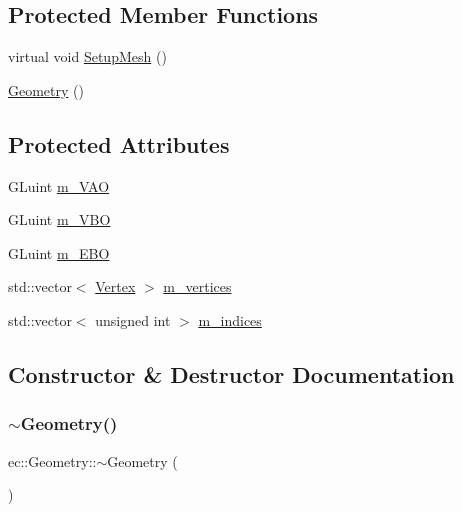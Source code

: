 \subsection*{Protected Member Functions}
\begin{DoxyCompactItemize}
\item 
virtual void \mbox{\hyperlink{classec_1_1_geometry_aec31f79de7f0afb78d4e3eb77b43574e}{Setup\+Mesh}} ()
\item 
\mbox{\hyperlink{classec_1_1_geometry_a409c80ac243a5eb27c2a98b17cc8b3e9}{Geometry}} ()
\end{DoxyCompactItemize}
\subsection*{Protected Attributes}
\begin{DoxyCompactItemize}
\item 
G\+Luint \mbox{\hyperlink{classec_1_1_geometry_af2451c093d0483611160531ac2a4f01e}{m\+\_\+\+V\+AO}}
\item 
G\+Luint \mbox{\hyperlink{classec_1_1_geometry_a418696e77f43a62bd8f78b8005ce7adf}{m\+\_\+\+V\+BO}}
\item 
G\+Luint \mbox{\hyperlink{classec_1_1_geometry_a5d57590449314c09c6950324f5da4f74}{m\+\_\+\+E\+BO}}
\item 
std\+::vector$<$ \mbox{\hyperlink{structec_1_1_vertex}{Vertex}} $>$ \mbox{\hyperlink{classec_1_1_geometry_a501c19ed82548d9a8ff628f55e750af3}{m\+\_\+vertices}}
\item 
std\+::vector$<$ unsigned int $>$ \mbox{\hyperlink{classec_1_1_geometry_ae6cf4719dfeee134a33a1272865f50a5}{m\+\_\+indices}}
\end{DoxyCompactItemize}


\subsection{Constructor \& Destructor Documentation}
\mbox{\label{classec_1_1_geometry_a964c581313da2be51a3c78d3be7f48b3}} 
\subsubsection{\texorpdfstring{$\sim$\+Geometry()}{~Geometry()}}
{\footnotesize\ttfamily ec\+::\+Geometry\+::$\sim$\+Geometry (\begin{DoxyParamCaption}{ }\end{DoxyParamCaption})\hspace{0.3cm}{\ttfamily [virtual]}}

